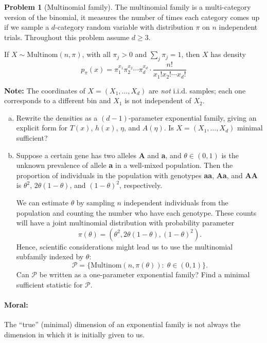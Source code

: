 \documentclass{article}
\newcommand{\cP}{\mathcal{P}}
\theoremstyle{definition}
\newtheorem{problem}{Problem}
\begin{document}
\begin{problem}[Multinomial family]

  The multinomial family is a multi-category version of the binomial, it measures the number of times each category comes up if we sample a $d$-category random variable with distribution $\pi$ on $n$ independent trials. Throughout this problem assume $d \geq 3$.

  If $X \sim \text{Multinom}(n, \pi)$, with all $\pi_j > 0$ and $\sum_j \pi_j = 1$, then $X$ has density
  \[
  p_\pi(x) = \pi_1^{x_1}\pi_2^{x_2}\cdots \pi_d^{x_d} \cdot \frac{n!}{x_1! x_2! \cdots x_d!}
  \]
  
  {\bf Note:} The coordinates of $X=(X_1,\ldots,X_d)$ are {\em not} i.i.d. samples; each one corresponds to a different bin and $X_1$ is not independent of $X_2$.

 \begin{enumerate}[(a)]
    
  \item Rewrite the densities as a $(d-1)$-parameter exponential family, giving an explicit form for $T(x)$, $h(x)$, $\eta$, and $A(\eta)$. Is $X=(X_1,\ldots,X_d)$ minimal sufficient? 

    
  
  \item Suppose a certain gene has two alleles {\bf A} and {\bf a}, and $\theta\in (0,1)$ is the unknown prevalence of allele {\bf a} in a well-mixed population. Then the proportion of individuals in the population with genotypes {\bf aa}, {\bf Aa}, and {\bf AA} is $\theta^2$, $2\theta(1-\theta)$, and $(1-\theta)^2$, respectively.

    We can estimate $\theta$ by sampling $n$ independent individuals from the population and counting the number who have each genotype. These counts will have a joint multinomial distribution with probability parameter
    \[
    \pi(\theta) = (\theta^2, 2\theta(1-\theta), (1-\theta)^2).
    \]
    Hence, scientific considerations might lead us to use the multinomial subfamily indexed by $\theta$:
    \[
    \cP = \{\text{Multinom}(n,\pi(\theta)):\; \theta \in (0,1)\}.
    \]
    Can $\cP$ be written as a one-parameter exponential family? Find a minimal sufficient statistic for $\cP$.

    
    
  \end{enumerate}

  \paragraph{Moral: } The ``true'' (minimal) dimension of an exponential family is not always the dimension in which it is initially given to us.

\end{problem}
\end{document}
